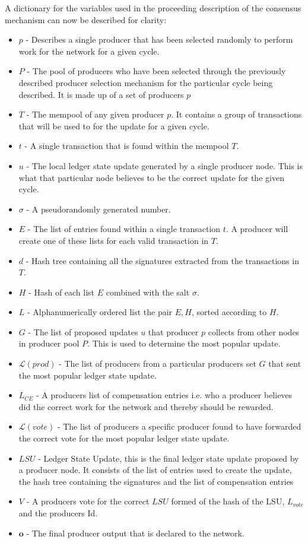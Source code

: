 A dictionary for the variables used in the proceeding description of the consensus mechanism can now be described for clarity:

\begin{itemize}

\item $p$ - Describes a single producer that has been selected randomly to perform work for the network for a given cycle. 
\item $P$ - The pool of producers who have been selected through the previously described producer selection mechanism for the particular cycle being described. It is made up of a set of producers $p$
\item $T$ - The mempool of any given producer $p$. It contains a group of transactions that will be used to for the update for a given cycle. 
\item $t$ - A single transaction that is found within the mempool $T$. 
\item $u$ - The local ledger state update generated by a single producer node. This is what that particular node believes to be the correct update for the given cycle. 
\item $\sigma$ - A pseudorandomly generated number. 
\item $E$ - The list of entries found within a single transaction $t$. A producer will create one of these lists for each valid transaction in $T$.
\item $d$ - Hash tree containing all the signatures extracted from the transactions in $T$.
\item $H$ - Hash of each list $E$ combined with the salt $\sigma$.
\item $L$ - Alphanumerically ordered list the pair $E,H$, sorted according to $H$. 
\item $G$ - The list of proposed updates $u$ that producer $p$ collects from other nodes in producer pool $P$. This is used to determine the most popular update. 
\item $\mathcal{L}(prod)$ - The list of producers from a particular producers set $G$ that sent the most popular ledger state update.
\item $L_{CE}$ - A producers list of compensation entries i.e. who a producer believes did the correct work for the network and thereby should be rewarded. 
\item $\mathcal{L}(vote)$ - The list of producers a specific producer found to have forwarded the correct vote for the most popular ledger state update. 
\item $LSU$ - Ledger State Update, this is the final ledger state update proposed by a producer node. It consists of the list of entries used to create the update, the hash tree containing the signatures and the list of compensation entries
\item $V$ - A producers vote for the correct $LSU$ formed of the hash of the LSU, $L_{vote}$ and the producers Id.
\item $\mathbf{o}$ - The final producer output that is declared to the network. 
\end{itemize}
